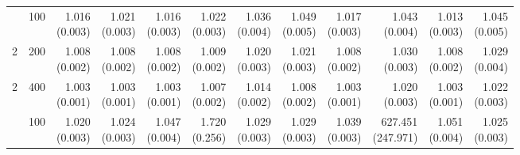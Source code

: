 \begin{table}[p]
{\begin{tabular}{llrrrrrrrrrr}
\addlinespace
2 & 100 & \shortstack{1.016\\(0.003)} & \shortstack{1.021\\(0.003)} & \shortstack{1.016\\(0.003)} & \shortstack{1.022\\(0.003)} & \shortstack{1.036\\(0.004)} & \shortstack{1.049\\(0.005)} & \shortstack{1.017\\(0.003)} & \shortstack{1.043\\(0.004)} & \shortstack{1.013\\(0.003)} & \shortstack{1.045\\(0.005)} \\
2 & 200 & \shortstack{1.008\\(0.002)} & \shortstack{1.008\\(0.002)} & \shortstack{1.008\\(0.002)} & \shortstack{1.009\\(0.002)} & \shortstack{1.020\\(0.003)} & \shortstack{1.021\\(0.003)} & \shortstack{1.008\\(0.002)} & \shortstack{1.030\\(0.003)} & \shortstack{1.008\\(0.002)} & \shortstack{1.029\\(0.004)} \\
2 & 400 & \shortstack{1.003\\(0.001)} & \shortstack{1.003\\(0.001)} & \shortstack{1.003\\(0.001)} & \shortstack{1.007\\(0.002)} & \shortstack{1.014\\(0.002)} & \shortstack{1.008\\(0.002)} & \shortstack{1.003\\(0.001)} & \shortstack{1.020\\(0.003)} & \shortstack{1.003\\(0.001)} & \shortstack{1.022\\(0.003)} \\
\addlinespace
3 & 100 & \shortstack{1.020\\(0.003)} & \shortstack{1.024\\(0.003)} & \shortstack{1.047\\(0.004)} & \shortstack{1.720\\(0.256)} & \shortstack{1.029\\(0.003)} & \shortstack{1.029\\(0.003)} & \shortstack{1.039\\(0.003)} & \shortstack{627.451\\(247.971)} & \shortstack{1.051\\(0.004)} & \shortstack{1.025\\(0.003)} \\

\end{tabular}}
\end{table}
